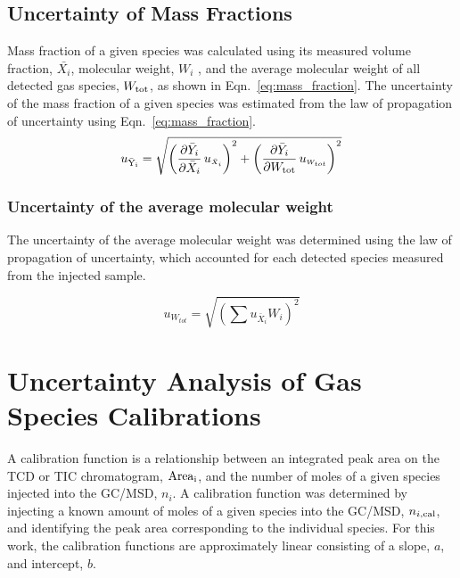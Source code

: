 \documentclass[12pt]{article}
\begin{document}
\subsection{Uncertainty of Mass Fractions}
\label{ssec:Uncertainty of Mass Fractions}
Mass fraction of a given species was calculated using its measured volume fraction, $\bar{X_{i}}$, molecular weight, $W_i$ , and the average molecular weight of all detected gas species, $W_{\rm tot}$, as shown in Eqn.~\ref{eq:mass_fraction}. The uncertainty of the mass fraction of a given species was estimated from the law of propagation of uncertainty using Eqn.~\ref{eq:mass_fraction}.
\begin{equation}\label{eq:Mass_Frac_Uncertainty}
u_\mathrm{\bar{Y}_{i}} = \sqrt{{\left( \frac{\partial \bar{Y}_{i}}{\partial \bar{X}_{i}}\,u_{\scriptscriptstyle \bar{X}_{i}} \right)}^2+{\left(\frac{\partial \bar{Y}_{i}}{\partial W_{\rm tot}}\,u_{\scriptscriptstyle W_{tot}}\right)}^2}
\end{equation}

\subsubsection{Uncertainty of the average molecular weight}
\label{ssec:Uncertainty of the average molecular weight}
The uncertainty of the average molecular weight was determined using the law of propagation of uncertainty, which accounted for each detected species measured from the injected sample.

\begin{equation}\label{eq:Uncertainty_Total_MW}
	u_{\scriptscriptstyle W_{tot}}=\sqrt{\left(\sum{{u_{\scriptscriptstyle \bar{X}_{i}}}{{W_{i}}}}\right)^2}
\end{equation}

\pagebreak

\section{Uncertainty Analysis of Gas Species Calibrations}\label{sec:Uncertainty Analysis of Gas Species Calibrations}
A calibration function is a relationship between an integrated peak area on the TCD or TIC chromatogram, $\rm{Area}_{i}$, and the number of moles of a given species injected into the GC/MSD, $n_{i}$. A calibration function was determined by injecting a known amount of moles of a given species into the GC/MSD, $n_{i,\rm cal}$, and identifying the peak area corresponding to the individual species. For this work, the calibration functions are approximately linear consisting of a slope, $a$, and intercept, $b$.
\end{document}
